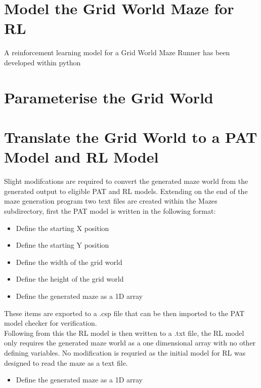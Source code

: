 \documentclass[twoside, 12pt, a4paper]{article}
\begin{document}
\section{Model the Grid World Maze for RL}
A reinforcement learning model for a Grid World Maze Runner has been developed within python
\section{Parameterise the Grid World}

\section{Translate the Grid World to a PAT Model and RL Model}
Slight modifcations are required to convert the generated maze world from the generated output to eligible PAT and RL models. Extending on the end of the maze generation program two text files are created within the Mazes subdirectory, first the PAT model is written in the following format:
\begin{itemize}
 \item Define the starting X position
 \item Define the starting Y position
 \item Define the width of the grid world
 \item Define the height of the grid world
 \item Define the generated maze as a 1D array
\end{itemize}
These items are exported to a .csp file that can be then imported to the PAT model checker for verification.\\
Following from this the RL model is then written to a .txt file, the RL model only requires the generated maze world as a one dimensional array with no other defining variables. No modification is requried as the initial model for RL was designed to read the maze as a text file.
\begin {itemize}
\item Define the generated maze as a 1D array
\end {itemize}
\end{document}
